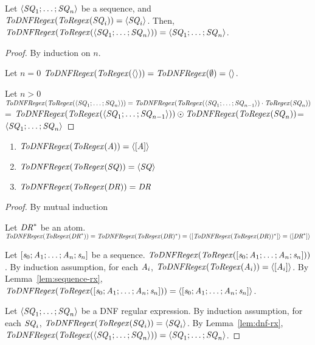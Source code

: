 \begin{lemma}
\label{lem:dnf-rx}
Let $\langle\mathit{SQ}_1;\ldots;\mathit{SQ}_n\rangle$ be a sequence,
and\\ $\mathit{ToDNFRegex}(\mathit{ToRegex}(\mathit{SQ}_i))=\langle\mathit{SQ}_i\rangle$.
Then,\\ $\mathit{ToDNFRegex}(\mathit{ToRegex}(\langle\mathit{SQ}_1;\ldots;\mathit{SQ}_n\rangle))=
\langle\mathit{SQ}_1;\ldots;\mathit{SQ}_n\rangle$.
\end{lemma}
\begin{proof}

By induction on $n$.

Let $n=0$
$\mathit{ToDNFRegex}(\mathit{ToRegex}(\langle\rangle))=\mathit{ToDNFRegex}(\emptyset)=\langle\rangle$.

Let $n>0$
$\mathit{ToDNFRegex}(\mathit{ToRegex}(\langle\mathit{SQ}_1;\ldots;\mathit{SQ}_n\rangle))=
\mathit{ToDNFRegex}(\mathit{ToRegex}(\langle\mathit{SQ}_1;\ldots;\mathit{SQ}_{n-1}\rangle)
\cdot\mathit{ToRegex}(\mathit{SQ}_n))$=
$\mathit{ToDNFRegex}(\mathit{ToRegex}(\langle\mathit{SQ}_1;\ldots;\mathit{SQ}_{n-1}\rangle))
\odot\\\mathit{ToDNFRegex}(\mathit{ToRegex}(\mathit{SQ}_n))$=
$\langle\mathit{SQ}_1;\ldots;\mathit{SQ}_n\rangle$
\end{proof}

\begin{lemma}\leavevmode
\begin{enumerate}
\item $\mathit{ToDNFRegex}(\mathit{ToRegex}(\mathit{A}))=\langle[\mathit{A}]\rangle$
\item $\mathit{ToDNFRegex}(\mathit{ToRegex}(\mathit{SQ}))=\langle\mathit{SQ}\rangle$
\item $\mathit{ToDNFRegex}(\mathit{ToRegex}(\mathit{DR}))=\mathit{DR}$
\end{enumerate}
\end{lemma}
\begin{proof}
By mutual induction

Let $\mathit{DR}^*$ be an atom.
$\mathit{ToDNFRegex}(\mathit{ToRegex}(\mathit{DR}^*))=
\mathit{ToDNFRegex}(\mathit{ToRegex}(\mathit{DR})^*)=
\langle[\mathit{ToDNFRegex}(\mathit{ToRegex}(\mathit{DR}))^*]\rangle=
\langle[\mathit{DR}^*]\rangle$

Let $[\mathit{s}_0;\mathit{A}_1;\ldots
;\mathit{A}_n;\mathit{s}_n]$ be a sequence.
$\mathit{ToDNFRegex}(\mathit{ToRegex}([\mathit{s}_0;\mathit{A}_1;\ldots
;\mathit{A}_n;\mathit{s}_n]))$.
By induction assumption, for each $\mathit{A}_i$,
$\mathit{ToDNFRegex}(\mathit{ToRegex}(\mathit{A}_i))=\langle[\mathit{A}_i]\rangle$.
By Lemma~\ref{lem:sequence-rx},
$\mathit{ToDNFRegex}(\mathit{ToRegex}([\mathit{s}_0;\mathit{A}_1;\ldots
;\mathit{A}_n;\mathit{s}_n]))=
\langle[\mathit{s}_0;\mathit{A}_1;\ldots
;\mathit{A}_n;\mathit{s}_n]\rangle$.

Let $\langle\mathit{SQ}_1;\ldots;\mathit{SQ}_n\rangle$ be a DNF
regular expression.
By induction assumption, for each $\mathit{SQ}_i$,
$\mathit{ToDNFRegex}(\mathit{ToRegex}(\mathit{SQ}_i))=\langle\mathit{SQ}_i\rangle$.
By Lemma~\ref{lem:dnf-rx},
$\mathit{ToDNFRegex}(\mathit{ToRegex}(\langle\mathit{SQ}_1;\ldots;\mathit{SQ}_n\rangle))=
\langle\mathit{SQ}_1;\ldots;\mathit{SQ}_n\rangle$.

\end{proof}
